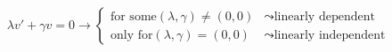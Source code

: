 \documentclass[preview]{standalone}
\begin{document}
\begin{align*}
\lambda v' + \gamma v = 0 \longrightarrow \begin{cases} \text{for some} (\lambda , \gamma) \neq (0,0) & \leadsto \text{linearly dependent} \\\text{only for} (\lambda , \gamma) = (0,0) & \leadsto \text{linearly independent}\end{cases}
\end{align*}
\end{document}
